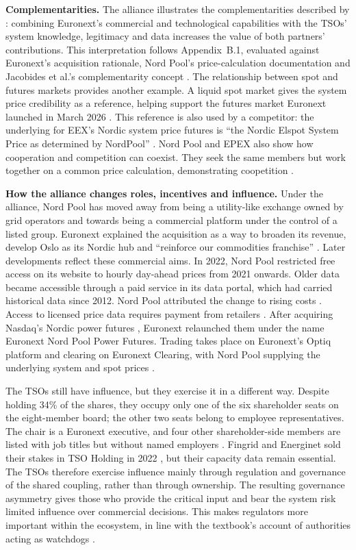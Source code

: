 \textbf{Complementarities.} The alliance illustrates the complementarities described by \citet{Jacobides2018}: combining Euronext's commercial and technological capabilities with the TSOs' system knowledge, legitimacy and data increases the value of both partners' contributions. This interpretation follows Appendix~B.1, evaluated against Euronext's acquisition rationale, Nord Pool's price-calculation documentation and Jacobides et al.'s complementarity concept \citep{Euronext2020,NPPrice,Jacobides2018}. The relationship between spot and futures markets provides another example. A liquid spot market gives the system price credibility as a reference, helping support the futures market Euronext launched in March 2026 \citep{Euronext2026}. This reference is also used by a competitor: the underlying for EEX's Nordic system price futures is ``the Nordic Elspot System Price as determined by NordPool'' \citep{EEX2024}. Nord Pool and EPEX also show how cooperation and competition can coexist. They seek the same members but work together on a common price calculation, demonstrating coopetition \citep[Def.~8.4]{OverbyAudestad2021}.

\textbf{How the alliance changes roles, incentives and influence.} Under the alliance, Nord Pool has moved away from being a utility-like exchange owned by grid operators and towards being a commercial platform under the control of a listed group. Euronext explained the acquisition as a way to broaden its revenue, develop Oslo as its Nordic hub and ``reinforce our commodities franchise'' \citep{Euronext2020}. Later developments reflect these commercial aims. In 2022, Nord Pool restricted free access on its website to hourly day-ahead prices from 2021 onwards. Older data became accessible through a paid service in its data portal, which had carried historical data since 2012. Nord Pool attributed the change to rising costs \citep{ERR2022}. Access to licensed price data requires payment from retailers \citep{NPData}. After acquiring Nasdaq's Nordic power futures \citep{FOW2025}, Euronext relaunched them under the name Euronext Nord Pool Power Futures. Trading takes place on Euronext's Optiq platform and clearing on Euronext Clearing, with Nord Pool supplying the underlying system and spot prices \citep{Euronext2026}.

The TSOs still have influence, but they exercise it in a different way. Despite holding 34\% of the shares, they occupy only one of the six shareholder seats on the eight-member board; the other two seats belong to employee representatives. The chair is a Euronext executive, and four other shareholder-side members are listed with job titles but without named employers \citep{NPBoard}. Fingrid and Energinet sold their stakes in TSO Holding in 2022 \citep{EPSOG2022Completed}, but their capacity data remain essential. The TSOs therefore exercise influence mainly through regulation and governance of the shared coupling, rather than through ownership. The resulting governance asymmetry gives those who provide the critical input and bear the system risk limited influence over commercial decisions. This makes regulators more important within the ecosystem, in line with the textbook's account of authorities acting as watchdogs \citep[Section~4.7]{OverbyAudestad2021}.

